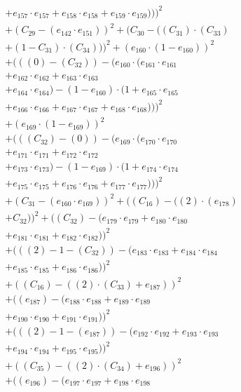 \documentclass[10pt, a4paper]{article}
\begin{document}
\begin{align*}
& + e_{157} \cdot e_{157} + e_{158} \cdot e_{158} + e_{159} \cdot e_{159})))^{2} \\
& + (C_{29} - (e_{142} \cdot e_{151}))^{2} + (C_{30} - ((C_{31})  \cdot  (C_{33}) \\
& + (1 - C_{31})  \cdot  (C_{34})))^{2} + (e_{160} \cdot (1 - e_{160}))^{2} \\
& + (((0) - (C_{32})) - (e_{160} \cdot (e_{161} \cdot e_{161} \\
& + e_{162} \cdot e_{162} + e_{163} \cdot e_{163} \\
& + e_{164} \cdot e_{164}) - (1 - e_{160}) \cdot (1 + e_{165} \cdot e_{165} \\
& + e_{166} \cdot e_{166} + e_{167} \cdot e_{167} + e_{168} \cdot e_{168})))^{2} \\
& + (e_{169} \cdot (1 - e_{169}))^{2} \\
& + (((C_{32}) - (0)) - (e_{169} \cdot (e_{170} \cdot e_{170} \\
& + e_{171} \cdot e_{171} + e_{172} \cdot e_{172} \\
& + e_{173} \cdot e_{173}) - (1 - e_{169}) \cdot (1 + e_{174} \cdot e_{174} \\
& + e_{175} \cdot e_{175} + e_{176} \cdot e_{176} + e_{177} \cdot e_{177})))^{2} \\
& + (C_{31} - (e_{160} \cdot e_{169}))^{2} + ((C_{16}) - ((2)  \cdot  (e_{178}) \\
& + C_{32}))^{2} + ((C_{32}) - (e_{179} \cdot e_{179} + e_{180} \cdot e_{180} \\
& + e_{181} \cdot e_{181} + e_{182} \cdot e_{182}))^{2} \\
& + (((2) - 1 - (C_{32})) - (e_{183} \cdot e_{183} + e_{184} \cdot e_{184} \\
& + e_{185} \cdot e_{185} + e_{186} \cdot e_{186}))^{2} \\
& + ((C_{16}) - ((2)  \cdot  (C_{33}) + e_{187}))^{2} \\
& + ((e_{187}) - (e_{188} \cdot e_{188} + e_{189} \cdot e_{189} \\
& + e_{190} \cdot e_{190} + e_{191} \cdot e_{191}))^{2} \\
& + (((2) - 1 - (e_{187})) - (e_{192} \cdot e_{192} + e_{193} \cdot e_{193} \\
& + e_{194} \cdot e_{194} + e_{195} \cdot e_{195}))^{2} \\
& + ((C_{35}) - ((2)  \cdot  (C_{34}) + e_{196}))^{2} \\
& + ((e_{196}) - (e_{197} \cdot e_{197} + e_{198} \cdot e_{198} \\

\end{align*}
\end{document}
